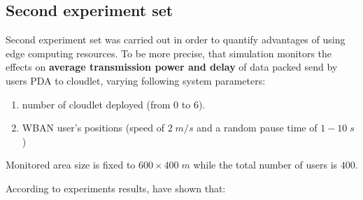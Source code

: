 \documentclass[sigchi]{acmart}
\begin{document}
\subsection{Second experiment set}

Second experiment set was carried out in order to quantify advantages of using edge computing resources. To be more precise, that simulation monitors the effects on \textbf{average transmission power and delay} of data packed send by users PDA to cloudlet, varying following system parameters:

\begin{enumerate}
\item number of cloudlet deployed (from 0 to 6).
\item WBAN user's positions (speed of $2\;m/s$ and a random pause time of $1-10\;s$)
\end{enumerate}

Monitored area size is fixed to $600 \times 400\;m$ while the total number of users is $400$.

According to experiments results, \cite{MSAReport} have shown that:
\end{document}
